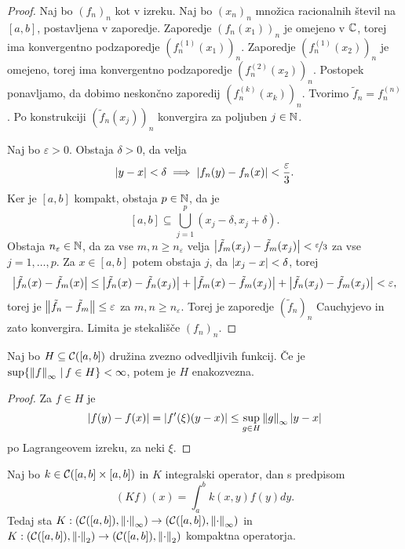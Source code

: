 \begin{proof}
  Naj bo $(f_n)_n$ kot v izreku.
  Naj bo $(x_n)_n$ množica racionalnih števil na $[a,b]$, postavljena v
  zaporedje.
  Zaporedje $(f_n(x_1))_n$ je omejeno v $\mathbb{C}$, torej ima konvergentno
  podzaporedje $(f_n^{(1)}(x_1))_n$.
  Zaporedje $(f_n^{(1)}(x_2))_n$ je omejeno, torej ima konvergentno podzaporedje
  $(f_n^{(2)}(x_2))_n$.
  Postopek ponavljamo, da dobimo neskončno zaporedij $(f_n^{(k)}(x_k))_n$.
  Tvorimo $\tilde{f}_n = f_n^{(n)}$.
  Po konstrukciji $(\tilde{f}_n(x_j))_n$ konvergira za poljuben $j \in \mathbb{N}$.

  Naj bo $\varepsilon > 0$.
  Obstaja $\delta > 0$, da velja
  \[
	\left| y-x \right| < \delta \implies \left| f_n(y) - f_n(x) \right| < \frac{\varepsilon}{3}.
  \]
  Ker je $[a,b]$ kompakt, obstaja $p \in \mathbb{N}$, da je
  \[
	[a,b] \subseteq \bigcup_{j=1}^p (x_j - \delta, x_j + \delta).
  \]
  Obstaja $n_\varepsilon \in \mathbb{N}$, da za vse $m,n \ge n_\varepsilon$ velja
  $\left| \tilde{f}_m(x_j) - \tilde{f}_m(x_j) \right| < \nicefrac{\varepsilon}{3}$ za vse
  $j=1, \ldots, p$.
  Za $x \in [a,b]$ potem obstaja $j$, da $\left| x_j -x \right| < \delta$, torej
  \[
	\left| \tilde{f}_n(x) - \tilde{f}_m(x) \right|
	\le \left| \tilde{f}_n(x) - \tilde{f}_n(x_j) \right| + \left| \tilde{f}_m(x) -
	  \tilde{f}_m(x_j) \right| + \left| \tilde{f}_n(x_j) - \tilde{f}_m(x_j) \right| <
	\varepsilon,
  \]
  torej je $\left\lVert\tilde{f}_n - \tilde{f}_m\right\rVert \le \varepsilon$ za $m, n \ge
  n_\varepsilon$.
  Torej je zaporedje $(\tilde{f}_n)_n$ Cauchyjevo in zato konvergira.
  Limita je stekališče $(f_n)_n$.
\end{proof}

\begin{trditev}
  Naj bo $H \subseteq \mathcal{C}([a,b])$ družina zvezno odvedljivih funkcij.
  Če je $\sup \{ \left\lVert f\right\rVert_\infty \,|\, f \in H \} < \infty$, potem je $H$
  enakozvezna.
\end{trditev}

\begin{proof}
  Za $f \in H$ je
  \[
	\left| f(y) - f(x) \right| = \left| f'(\xi) (y-x) \right| \le \sup_{g \in H} \left\lVert g\right\rVert_\infty
	\left| y-x \right|
  \]
  po Lagrangeovem izreku, za neki $\xi$.
\end{proof}

\begin{izrek}
  Naj bo $k \in \mathcal{C}([a,b] \times [a,b])$ in $K$ integralski operator, dan s
  predpisom
  \[
	(Kf)(x) = \int_a^b k(x,y) f(y) dy.
  \]
  Tedaj sta $K: (\mathcal{C}([a,b]), \left\lVert\cdot\right\rVert_\infty) \to (\mathcal{C}([a,b]),
  \left\lVert\cdot\right\rVert_\infty)$ in $K: (\mathcal{C}([a,b]), \left\lVert\cdot\right\rVert_2) \to
  (\mathcal{C}([a,b]), \left\lVert\cdot\right\rVert_2)$ kompaktna operatorja.
\end{izrek}

